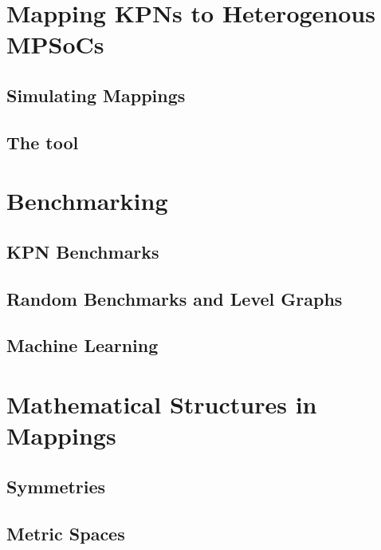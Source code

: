\documentclass[
		twoside,openright,titlepage,numbers=noenddot,headinclude,%
	 	footinclude=true,cleardoublepage=empty,
		dottedtoc, %
		BCOR=5mm,paper=a4,fontsize=10pt, %
		ngerman,american, %
		]{scrreprt}
\begin{document}
%
\chapter{Mapping \acsp{KPN} to Heterogenous \acsp{MPSoC}}
\label{chap:mapping}


\section{Simulating Mappings}
\label{sec:simulating_mappings}

\section{The \mocasin tool}
\label{sec:mocasin}


\chapter{Benchmarking}
\label{chap:benchmarking}

\section{KPN Benchmarks}
\label{sec:kpn_benchmarks}

\section{Random Benchmarks and Level Graphs}
\label{sec:level_graphs}
\section{Machine Learning}
\label{sec:machine_learning}


\chapter{Mathematical Structures in Mappings}
\label{chap:mapping_structures}

\section{Symmetries}
\label{sec:symmetries}
\section{Metric Spaces}
\label{sec:metric}
\end{document}
